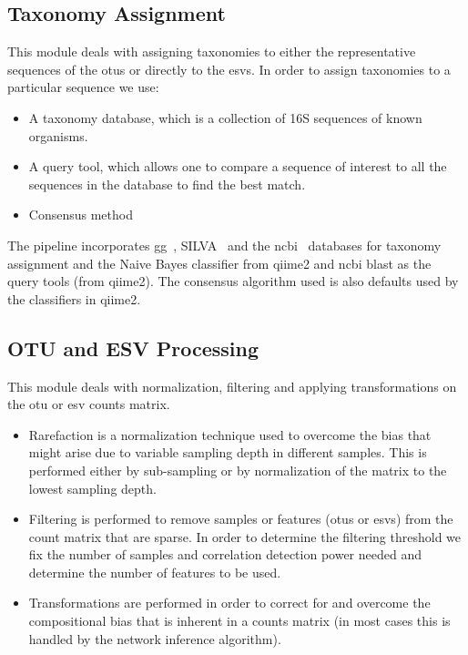   \subsection*{Taxonomy Assignment}
  \vspace{-5mm}
  This module deals with assigning taxonomies to either the representative sequences of the \ac{otu}s or directly to the \ac{esv}s.
  In order to assign taxonomies to a particular sequence we use:
  \begin{itemize}
    \item A taxonomy database, which is a collection of 16S sequences of known organisms.
    \item A query tool, which allows one to compare a sequence of interest to all the sequences in the database to find the best match.
    \item Consensus method
  \end{itemize}
  The pipeline incorporates \ac{gg}~\cite{DeSantis2006}, SILVA~\cite{Quast2012} and the \ac{ncbi}~\cite{Sayers2009} databases for taxonomy assignment and the Naive Bayes classifier from \ac{qiime2} and \ac{ncbi} blast as the query tools (from \ac{qiime2}).
  The consensus algorithm used is also defaults used by the classifiers in \ac{qiime2}.

  \subsection*{OTU and ESV Processing}
  \vspace{-5mm}
  This module deals with normalization, filtering and applying transformations on the \ac{otu} or \ac{esv} counts matrix.
  \begin{itemize}
    \item Rarefaction is a normalization technique used to overcome the bias that might arise due to variable sampling depth in different samples. This is performed either by sub-sampling or by normalization of the matrix to the lowest sampling depth.
    \item Filtering is performed to remove samples or features (\ac{otu}s or \ac{esv}s) from the count matrix that are sparse. In order to determine the filtering threshold we fix the number of samples and correlation detection power needed  and determine the number of features to be used.
    \item Transformations are performed in order to correct for and overcome the compositional bias that is inherent in a counts matrix (in most cases this is handled by the network inference algorithm).
  \end{itemize}

